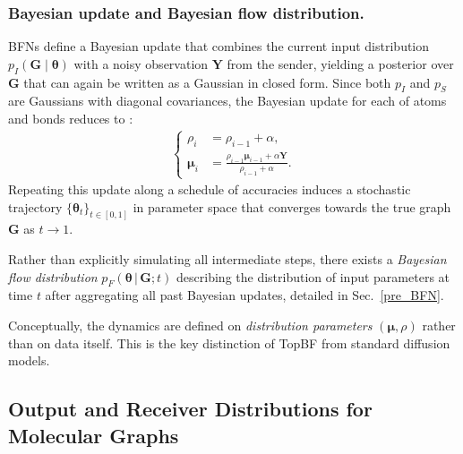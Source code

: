\documentclass[journal,twoside,web]{ieeecolor}
\begin{document}
\subsubsection{Bayesian update and Bayesian flow distribution.}
BFNs define a Bayesian update that combines the current input distribution $p_I(\mathbf{G} \mid \boldsymbol{\theta})$ with a noisy observation $\mathbf{Y}$ from the sender, yielding a posterior over $\mathbf{G}$ that can again be written as a Gaussian in closed form. Since both $p_I$ and $p_S$ are Gaussians with diagonal covariances, the Bayesian update for each of atoms and bonds reduces to \cite{murphy2007conjugate}:
\begin{equation} %
\label{eq:bayes-update}
\begin{aligned}
        \left\{
\begin{aligned}
    \rho_i &= \rho_{i-1} + \alpha, \\
    \boldsymbol{\mu}_i  &= \frac{\rho_{i-1} \boldsymbol{\mu}_{i-1} + \alpha \mathbf{Y}}{\rho_{i-1} + \alpha}.
\end{aligned}
\right.
\end{aligned}
\end{equation}
Repeating this update along a schedule of accuracies induces a stochastic trajectory $\{\boldsymbol{\theta}_t\}_{t \in [0,1]}$ in parameter space that converges towards the true graph $\mathbf{G}$ as $t \to 1$.

Rather than explicitly simulating all intermediate steps, there exists a \emph{Bayesian flow distribution} $p_F(\boldsymbol{\theta}\,|\,\mathbf{G}; t)$ describing the distribution of input parameters at time $t$ after aggregating all past Bayesian updates, detailed in Sec.~\ref{pre_BFN}.

Conceptually, the dynamics are defined on \emph{distribution parameters} $(\boldsymbol{\mu}, \rho)$ rather than on data itself. This is the key distinction of TopBF from standard diffusion models.



\subsection{Output and Receiver Distributions for Molecular Graphs}
\end{document}
